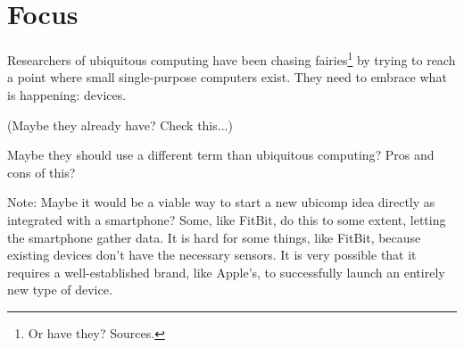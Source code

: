 \section{Focus}

Researchers of ubiquitous computing have been chasing fairies\footnote{Or have they? Sources.} by trying to reach
a point where small single-purpose computers exist. They need to embrace what is happening: devices.

(Maybe they already have? Check this...)

Maybe they should use a different term than ubiquitous computing? Pros and cons of this?

Note: Maybe it would be a viable way to start a new ubicomp idea directly as integrated with a smartphone? Some, like FitBit,
do this to some extent, letting the smartphone gather data. It is hard for some things, like FitBit, because existing devices
don't have the necessary sensors. It is very possible that it requires a well-established brand, like Apple's, to successfully
launch an entirely new type of device.